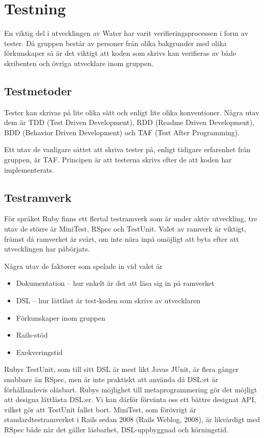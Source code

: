\section{Testning}
En viktig del i utvecklingen av Water har varit verifieringsprocessen i form av tester. Då gruppen består av personer från olika bakgrunder med olika förkunskaper så är det viktigt att koden som skrivs kan verifieras av både skribenten och övriga utvecklare inom gruppen.

\subsection{Testmetoder}
Tester kan skrivas på lite olika sätt och enligt lite olika konventioner. Några utav dem är TDD (Test Driven Development), RDD (Readme Driven Development), BDD (Behavior Driven Development) och TAF (Test After Programming).

Ett utav de vanligare sättet att skriva tester på, enligt tidigare erfarenhet från gruppen, är TAF. Principen är att testerna skrivs efter de att koden har implementerats.

\subsection{Testramverk}
För språket Ruby finns ett flertal testramverk som är under aktiv utveckling, tre utav de större är MiniTest, RSpec och TestUnit. Valet av ramverk är viktigt, främst då ramverket är svårt, om inte nära inpå omöjligt att byta efter att utvecklingen har påbörjats.

Några utav de faktorer som spelade in vid valet är
\begin{itemize}
    \item Dokumentation – hur enkelt är det att läsa sig in på ramverket
    \item DSL – hur lättläst är test-koden som skrivs av utvecklaren
    \item Förkunskaper inom gruppen
    \item Rails-stöd
    \item Exekveringstid
\end{itemize}

Rubys TestUnit, som till sitt DSL är mest likt Javas JUnit, är flera gånger snabbare än RSpec, men är inte praktiskt att använda då DSL:et är förhållandevis oläsbart. Rubys möjlighet till metaprogrammering gör det möjligt att designa lättlästa DSL:er. Vi kan därför förvänta oss ett bättre designat API, vilket gör att TestUnit fallet bort.
MiniTest, som förövrigt är standardtestramverket i Rails sedan 2008 (Rails Weblog, 2008), är likvärdigt med RSpec både när det gäller läsbarhet, DSL-uppbyggnad och körningstid.

